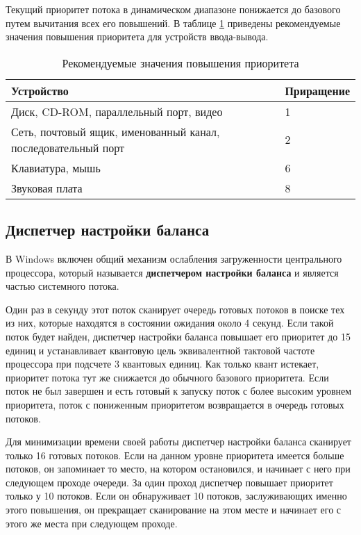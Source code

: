 Текущий приоритет потока в динамическом диапазоне понижается до базового путем вычитания всех его повышений. В таблице \ref{tab:input-output} приведены рекомендуемые значения повышения приоритета для устройств ввода-вывода.

\begin{table}[!h]
	\caption{Рекомендуемые значения повышения приоритета}
	\begin{center}
		\begin{tabular}{|p{100mm}|l|}
			\hline
			\textbf{Устройство} & \textbf{Приращение} \\\hline
			Диск, CD-ROM, параллельный порт, видео & 1 \\ \hline
			Сеть, почтовый ящик, именованный канал, последовательный порт & 2 \\ \hline
			Клавиатура, мышь & 6 \\ \hline
			Звуковая плата & 8 \\ \hline
		\end{tabular}
	\end{center}
	\label{tab:input-output}
\end{table}

\subsection{Диспетчер настройки баланса}

В Windows включен общий механизм ослабления загруженности центрального процессора, который называется \textbf{диспетчером настройки баланса} и является частью системного потока.

Один раз в секунду этот поток сканирует очередь готовых потоков в поиске тех из них, которые находятся в состоянии ожидания около 4 секунд.
Если такой поток будет найден, диспетчер настройки баланса повышает его приоритет до 15 единиц и устанавливает квантовую цель эквивалентной тактовой частоте процессора при подсчете 3 квантовых единиц.
Как только квант истекает, приоритет потока тут же снижается до обычного базового приоритета.
Если поток не был завершен и есть готовый к запуску поток с более высоким уровнем приоритета, поток с пониженным приоритетом возвращается в очередь готовых потоков.

Для минимизации времени своей работы диспетчер настройки баланса сканирует только 16 готовых потоков.
Если на данном уровне приоритета имеется больше потоков, он запоминает то место, на котором остановился, и начинает с него при следующем проходе очереди.
За один проход диспетчер повышает приоритет только у 10 потоков.
Если он обнаруживает 10 потоков, заслуживающих именно этого повышения, он прекращает сканирование на этом месте и начинает его с этого же места при следующем проходе.

